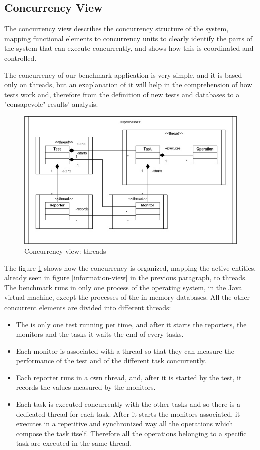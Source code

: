 		\subsection{Concurrency View}
The concurrency view describes the concurrency structure of the system, mapping functional elements to concurrency units to clearly identify the parts of the system that can execute concurrently, and shows how this is coordinated and controlled.

The concurrency of our benchmark application is very simple, and it is based only on threads, but an exaplanation of it will help in the comprehension of how tests work and, therefore from the definition of new tests and databases to a "consapevole" results' analysis. 

\begin{figure}[htp!] 
	\begin{center}
		\includegraphics[width=13cm]{img/concorrenza.jpg}	
	\end{center}
	\caption{Concurrency view: threads}
	\label{concurrency-view}	
\end{figure}

The figure \ref{concurrency-view} shows how the concurrency is organized, mapping the active entities, already seen in figure \ref{information-view} in the previous paragraph, to threads. The benchmark runs in only one process of the operating system, in the Java virtual machine, except the processes of the in-memory databases. All the other concurrent elements are divided into different threads:
\begin{itemize}
	\item The is only one test running per time, and after it starts the reporters, the monitors and the tasks it waits the end of every tasks.
	\item Each monitor is associated with a thread so that they can measure the performance of the test and of the different task concurrently.
	\item Each reporter runs in a own thread, and, after it is started by the test, it records the values measured by the monitors.
	\item Each task is executed concurrently with the other tasks and so there is a dedicated thread for each task. After it starts the monitors associated, it executes in a repetitive and synchronized way all the operations which compose the task itself.	Therefore all the operations belonging to a specific task are executed in the same thread.
\end{itemize}

